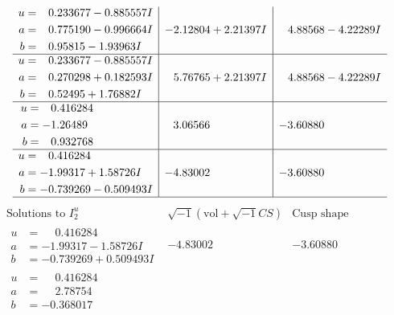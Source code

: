 \documentclass[1p]{elsarticle_modified}
\theoremstyle{definition}
\newcommand{\I}{\sqrt{-1}}
\begin{document}
$$\begin{array}{c|c|c}
\begin{aligned}
u &= \phantom{-}0.233677 - 0.885557 I \\
a &= \phantom{-}0.775190 - 0.996664 I \\
b &= \phantom{-}0.95815 - 1.93963 I\end{aligned}
 & -2.12804 + 2.21397 I & \phantom{-}4.88568 - 4.22289 I \\ \hline\begin{aligned}
u &= \phantom{-}0.233677 - 0.885557 I \\
a &= \phantom{-}0.270298 + 0.182593 I \\
b &= \phantom{-}0.52495 + 1.76882 I\end{aligned}
 & \phantom{-}5.76765 + 2.21397 I & \phantom{-}4.88568 - 4.22289 I \\ \hline\begin{aligned}
u &= \phantom{-}0.416284\phantom{ +0.000000I} \\
a &= -1.26489\phantom{ +0.000000I} \\
b &= \phantom{-}0.932768\phantom{ +0.000000I}\end{aligned}
 & \phantom{-}3.06566\phantom{ +0.000000I} & -3.60880\phantom{ +0.000000I} \\ \hline\begin{aligned}
u &= \phantom{-}0.416284\phantom{ +0.000000I} \\
a &= -1.99317 + 1.58726 I \\
b &= -0.739269 - 0.509493 I\end{aligned}
 & -4.83002\phantom{ +0.000000I} & -3.60880\phantom{ +0.000000I}\\
 \hline 
 \end{array}$$\newpage$$\begin{array}{c|c|c}  
\text{Solutions to }I^u_{2}& \I (\text{vol} + \sqrt{-1}CS) & \text{Cusp shape}\\
 \hline 
\begin{aligned}
u &= \phantom{-}0.416284\phantom{ +0.000000I} \\
a &= -1.99317 - 1.58726 I \\
b &= -0.739269 + 0.509493 I\end{aligned}
 & -4.83002\phantom{ +0.000000I} & -3.60880\phantom{ +0.000000I} \\ \hline\begin{aligned}
u &= \phantom{-}0.416284\phantom{ +0.000000I} \\
a &= \phantom{-}2.78754\phantom{ +0.000000I} \\
b &= -0.368017\phantom{ +0.000000I}\end{aligned}

\end{array}$$
\end{document}
